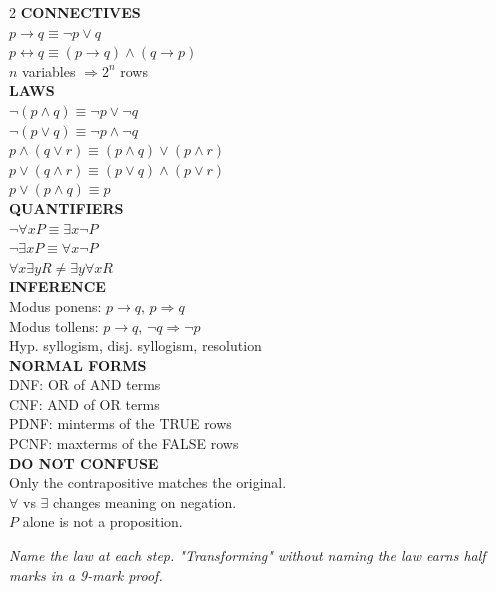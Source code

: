 \documentclass[11pt,a4paper]{article}
\begin{document}
\begin{multicols}{2}
\textbf{CONNECTIVES}\\
$p\to q\equiv\neg p\lor q$\\
$p\leftrightarrow q\equiv(p\to q)\land(q\to p)$\\
$n$ variables $\Rightarrow 2^n$ rows\\[4pt]
\textbf{LAWS}\\
$\neg(p\land q)\equiv\neg p\lor\neg q$\\
$\neg(p\lor q)\equiv\neg p\land\neg q$\\
$p\land(q\lor r)\equiv(p\land q)\lor(p\land r)$\\
$p\lor(q\land r)\equiv(p\lor q)\land(p\lor r)$\\
$p\lor(p\land q)\equiv p$\\[4pt]
\textbf{QUANTIFIERS}\\
$\neg\forall xP\equiv\exists x\neg P$\\
$\neg\exists xP\equiv\forall x\neg P$\\
$\forall x\exists yR \ne \exists y\forall xR$\\[4pt]
\textbf{INFERENCE}\\
Modus ponens: $p\to q,\,p\Rightarrow q$\\
Modus tollens: $p\to q,\,\neg q\Rightarrow\neg p$\\
Hyp. syllogism, disj. syllogism, resolution\\[4pt]
\textbf{NORMAL FORMS}\\
DNF: OR of AND terms\\
CNF: AND of OR terms\\
PDNF: minterms of the TRUE rows\\
PCNF: maxterms of the FALSE rows\\[4pt]
\textbf{DO NOT CONFUSE}\\
Only the contrapositive matches the original.\\
$\forall$ vs $\exists$ changes meaning on negation.\\
$P$ alone is not a proposition.
\end{multicols}

\vfill
\begin{center}\textit{Name the law at each step. "Transforming" without naming the law earns half marks in a 9-mark proof.}\end{center}
\end{document}
